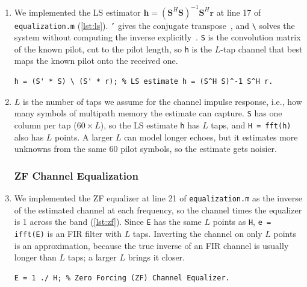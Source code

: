 \documentclass[11pt]{article}
\begin{document}
\begin{enumerate}[resume]
    \item We implemented the LS estimator $\mathbf{h} = (\mathbf{S}^H\mathbf{S})^{-1}\mathbf{S}^H\mathbf{r}$ at line 17 of \texttt{equalization.m} (\cref{lst:ls}). \texttt{'} gives the conjugate transpose~\cite{ctranspose}, and \texttt{\textbackslash} solves the system without computing the inverse explicitly~\cite{mldivide}. \texttt{S} is the convolution matrix of the known pilot, cut to the pilot length, so \texttt{h} is the $L$-tap channel that best maps the known pilot onto the received one.

\begin{lstlisting}[caption={LS channel estimation in \texttt{equalization.m} (line 17).}, label={lst:ls}]
h = (S' * S) \ (S' * r); % LS estimate h = (S^H S)^-1 S^H r.
\end{lstlisting}

    \item $L$ is the number of taps we assume for the channel impulse response, i.e., how many symbols of multipath memory the estimate can capture. \texttt{S} has one column per tap ($60 \times L$), so the LS estimate \texttt{h} has $L$ taps, and \texttt{H = fft(h)} also has $L$ points. A larger $L$ can model longer echoes, but it estimates more unknowns from the same 60 pilot symbols, so the estimate gets noisier.

\subsubsection*{ZF Channel Equalization}

    \item We implemented the ZF equalizer at line 21 of \texttt{equalization.m} as the inverse of the estimated channel at each frequency, so the channel times the equalizer is 1 across the band (\cref{lst:zf}). Since \texttt{E} has the same $L$ points as \texttt{H}, \texttt{e = ifft(E)} is an FIR filter with $L$ taps. Inverting the channel on only $L$ points is an approximation, because the true inverse of an FIR channel is usually longer than $L$ taps; a larger $L$ brings it closer.

\begin{lstlisting}[caption={ZF equalizer in \texttt{equalization.m} (line 21).}, label={lst:zf}]
E = 1 ./ H; % Zero Forcing (ZF) Channel Equalizer.
\end{lstlisting}


\end{enumerate}
\end{document}
